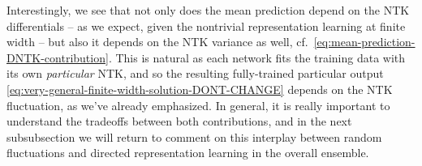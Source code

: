 Interestingly, we see that not only does the mean prediction depend on the
NTK differentials -- as we expect, given the nontrivial representation learning at finite width -- but also it depends on the NTK variance as well, cf.~\eqref{eq:mean-prediction-DNTK-contribution}. 
This is natural as each network fits the training data with its own \emph{particular} NTK, and so the resulting fully-trained particular output \eqref{eq:very-general-finite-width-solution-DONT-CHANGE} depends on the NTK fluctuation, as we've already emphasized. In general, it is really important to understand the tradeoffs between both contributions, and in the next subsubsection we will return to comment on this interplay between random fluctuations and directed representation learning in the overall ensemble.




